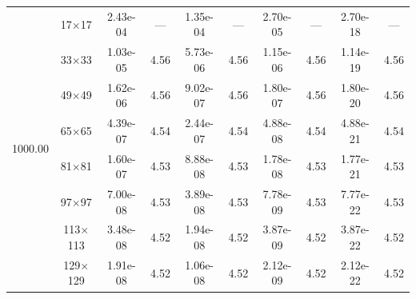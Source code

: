 \begin{table}[H]
{\begin{tabular*}{\textwidth}{@{\extracolsep\fill}c|c|cc|cc|cc|cc@{}}
                \multirow{10}{*}{1000.00} & 17$\times$17 & 2.43e-04 & --- & 1.35e-04 & --- & 2.70e-05 & --- & 2.70e-18 & --- \\
                & 33$\times$33 & 1.03e-05 & 4.56 & 5.73e-06 & 4.56 & 1.15e-06 & 4.56 & 1.14e-19 & 4.56 \\
                & 49$\times$49 & 1.62e-06 & 4.56 & 9.02e-07 & 4.56 & 1.80e-07 & 4.56 & 1.80e-20 & 4.56 \\
                & 65$\times$65 & 4.39e-07 & 4.54 & 2.44e-07 & 4.54 & 4.88e-08 & 4.54 & 4.88e-21 & 4.54 \\
                & 81$\times$81 & 1.60e-07 & 4.53 & 8.88e-08 & 4.53 & 1.78e-08 & 4.53 & 1.77e-21 & 4.53 \\
                & 97$\times$97 & 7.00e-08 & 4.53 & 3.89e-08 & 4.53 & 7.78e-09 & 4.53 & 7.77e-22 & 4.53 \\
                & 113$\times$113 & 3.48e-08 & 4.52 & 1.94e-08 & 4.52 & 3.87e-09 & 4.52 & 3.87e-22 & 4.52 \\
                & 129$\times$129 & 1.91e-08 & 4.52 & 1.06e-08 & 4.52 & 2.12e-09 & 4.52 & 2.12e-22 & 4.52 \\
                \bottomrule
            \end{tabular*}
	}{%
	\fdadospesquisa
	}
\end{table}

